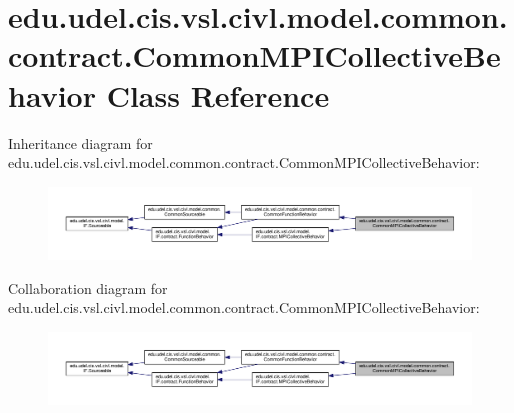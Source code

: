 \hypertarget{classedu_1_1udel_1_1cis_1_1vsl_1_1civl_1_1model_1_1common_1_1contract_1_1CommonMPICollectiveBehavior}{}\section{edu.\+udel.\+cis.\+vsl.\+civl.\+model.\+common.\+contract.\+Common\+M\+P\+I\+Collective\+Behavior Class Reference}
\label{classedu_1_1udel_1_1cis_1_1vsl_1_1civl_1_1model_1_1common_1_1contract_1_1CommonMPICollectiveBehavior}


Inheritance diagram for edu.\+udel.\+cis.\+vsl.\+civl.\+model.\+common.\+contract.\+Common\+M\+P\+I\+Collective\+Behavior\+:
\nopagebreak
\begin{figure}[H]
\begin{center}
\leavevmode
\includegraphics[width=350pt]{classedu_1_1udel_1_1cis_1_1vsl_1_1civl_1_1model_1_1common_1_1contract_1_1CommonMPICollectiveBehavior__inherit__graph}
\end{center}
\end{figure}


Collaboration diagram for edu.\+udel.\+cis.\+vsl.\+civl.\+model.\+common.\+contract.\+Common\+M\+P\+I\+Collective\+Behavior\+:
\nopagebreak
\begin{figure}[H]
\begin{center}
\leavevmode
\includegraphics[width=350pt]{classedu_1_1udel_1_1cis_1_1vsl_1_1civl_1_1model_1_1common_1_1contract_1_1CommonMPICollectiveBehavior__coll__graph}
\end{center}
\end{figure}
